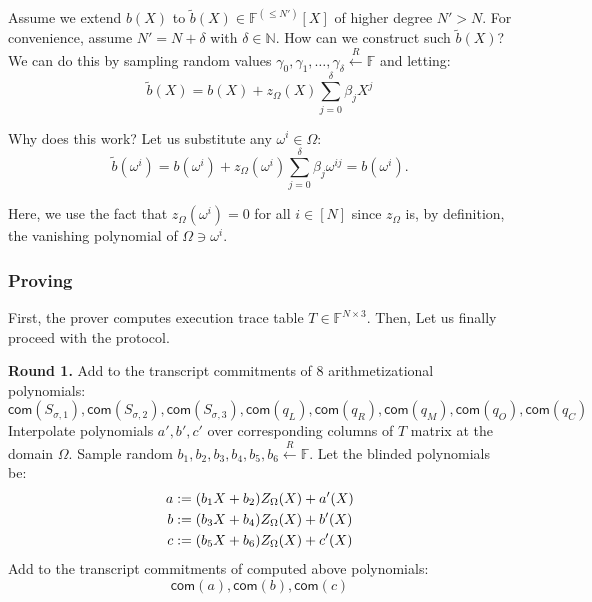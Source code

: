 \documentclass[../lecture-notes.tex]{subfiles}
\begin{document}
Assume we extend $b(X)$ to $\widetilde{b}(X) \in \mathbb{F}^{(\leq N')}[X]$ of
higher degree $N'>N$. For convenience, assume $N' = N + \delta$ with $\delta \in
\mathbb{N}$. How can we construct such $\widetilde{b}(X)$? We can do this by
sampling random values $\gamma_0,\gamma_1,\dots,\gamma_{\delta} \xleftarrow{R} \mathbb{F}$ and 
letting:
\begin{equation*}
    \widetilde{b}(X) = b(X) + z_{\Omega}(X)\sum_{j=0}^{\delta}\beta_jX^j
\end{equation*}

Why does this work? Let us substitute any $\omega^i \in \Omega$:
\begin{equation*}
    \widetilde{b}(\omega^i) = b(\omega^i) + z_{\Omega}(\omega^i)\sum_{j=0}^{\delta}\beta_j\omega^{ij} = b(\omega^i).
\end{equation*}

Here, we use the fact that $z_{\Omega}(\omega^i) = 0$ for all $i \in [N]$ since $z_{\Omega}$ is, 
by definition, the vanishing polynomial of $\Omega \ni \omega^i$.

\subsubsection{Proving}
First, the prover computes execution trace table $T \in \mathbb{F}^{N\times 3}$.
Then,  Let us 
finally proceed with the protocol.

\textcolor{green!60!black}{\textbf{Round 1.}} Add to the transcript commitments
of 8 arithmetizational polynomials:
\begin{equation*}
    \mathsf{com}(S_{\sigma,1}), \mathsf{com}(S_{\sigma,2}), \mathsf{com}(S_{\sigma,3}), \mathsf{com}(q_L), \mathsf{com}(q_R), \mathsf{com}(q_M), \mathsf{com}(q_O), \mathsf{com}(q_C)
\end{equation*}
Interpolate polynomials $a', b', c'$ over corresponding columns of $T$ matrix at
the domain $\Omega$. Sample random $b_1, b_2, b_3, b_4, b_5, b_6 \xleftarrow{R}
\mathbb{F}$. Let the blinded polynomials be:
\begin{align*}
\centering
a &:= (b_1 X + b_2)Z_{\Omega}(X) + a'(X) \\
b &:= (b_3 X + b_4)Z_{\Omega}(X) + b'(X) \\
c &:= (b_5 X + b_6)Z_{\Omega}(X) + c'(X)
\end{align*}
Add to the transcript commitments of computed above polynomials:
\begin{equation*}
    \mathsf{com}(a), \mathsf{com}(b), \mathsf{com}(c)
\end{equation*}
\end{document}
